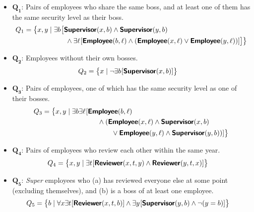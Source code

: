 \begin{itemize}[topsep=0.5pc,itemsep=0.25pc]
    \item  $\boldsymbol{Q_1}$\hrsp:\;
        Pairs of employees who share the same boss, and at least one of them has the same security level as their boss.
        \begin{align*}
            Q_1 &= \big\{ \empX, \empY \mid
                \exists \boss \hrsp\big[
                    \Supervisor(\empX, \boss) \wedge \Supervisor(\empY, \boss) \\
            & \qquad\qquad\qquad\wedge \exists \level \hrsp[\Employee(\boss, \level) \wedge (\Employee(\empX, \level) \vee \Employee(\empY, \level))]\big]\big\}
        \end{align*}

    \item  $\boldsymbol{Q_2}$\hrsp:\;
        Employees without their own bosses.
        \begin{align*}
            Q_2 &= \big\{ \empX \mid
                \neg \exists \boss \hrsp[\Supervisor(\empX, \boss)] \big\}
        \end{align*}

    \item  $\boldsymbol{Q_3}$\hrsp:\;
        Pairs of employees, one of which has the same security level as one of their bosses.
        \begin{align*}
            Q_3 &= \big\{ \empX, \empY \mid
                \exists \boss \exists \level \hrsp[\Employee(\boss, \level) \\
            & \qquad\qquad\qquad\qquad\wedge (\Employee(\empX, \level) \wedge \Supervisor(x, b)  \\
            & \qquad\qquad\qquad\qquad\qquad\vee \Employee(\empY, \level) \wedge \Supervisor(y, b))]\big\}
        \end{align*}

    \item  $\boldsymbol{Q_4}$\hrsp:\;
        Pairs of employees who review each other within the same year.
        \begin{align*}
            Q_4 &= \big\{ \empX, \empY \mid
                \exists \yearT \hrsp[\Reviewer(\empX, \yearT, \empY) \wedge \Reviewer(\empY, \yearT, \empX)] \big\}
        \end{align*}

    \item  $\boldsymbol{Q_5}$\hrsp:\;
        \emph{Super} employees who (a) has reviewed everyone else at some point (excluding themselves), and (b) is a boss of at least one employee.
        \begin{align*}
            Q_5 &= \big\{ \boss \mid
                \forall \empX \exists \yearT \hrsp[\Reviewer(\empX, \yearT, \boss)]
                \wedge \exists \empY \hrsp[
                \Supervisor(\empY, \boss) \wedge \neg(\empY = \boss)] \big\}
        \end{align*}
\end{itemize}


